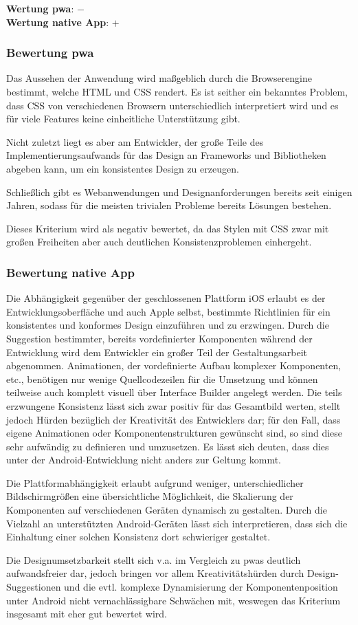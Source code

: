 \textbf{Wertung \ac{pwa}}: $-$\\
\textbf{Wertung native App}: $+$ \\

\subsubsection{Bewertung \ac{pwa}}
Das Aussehen der Anwendung wird maßgeblich durch die Browserengine bestimmt, welche HTML und CSS rendert. Es ist seither ein bekanntes Problem, dass CSS von verschiedenen Browsern unterschiedlich interpretiert wird und es für viele Features keine einheitliche Unterstützung gibt. \cite{MozillaHandlingCommonHTMLCSSProblems}

Nicht zuletzt liegt es aber am Entwickler, der große Teile des Implementierungsaufwands für das Design an Frameworks und Bibliotheken abgeben kann, um ein konsistentes Design zu erzeugen. 

Schließlich gibt es Webanwendungen und Designanforderungen bereits seit einigen Jahren, sodass für die meisten trivialen Probleme bereits Lösungen bestehen.

Dieses Kriterium wird als negativ bewertet, da das Stylen mit CSS zwar mit großen Freiheiten aber auch deutlichen Konsistenzproblemen einhergeht.

\subsubsection{Bewertung native App}
Die Abhängigkeit gegenüber der geschlossenen Plattform iOS erlaubt es der Entwicklungsoberfläche und auch Apple selbst, bestimmte Richtlinien für ein konsistentes und konformes Design einzuführen und zu erzwingen. Durch die Suggestion bestimmter, bereits vordefinierter Komponenten während der Entwicklung wird dem Entwickler ein großer Teil der Gestaltungsarbeit abgenommen. Animationen, der vordefinierte Aufbau komplexer Komponenten, etc., benötigen nur wenige Quellcodezeilen für die Umsetzung und können teilweise auch komplett visuell über Interface Builder angelegt werden. Die teils erzwungene Konsistenz lässt sich zwar positiv für das Gesamtbild werten, stellt jedoch Hürden bezüglich der Kreativität des Entwicklers dar; für den Fall, dass eigene Animationen oder Komponentenstrukturen gewünscht sind, so sind diese sehr aufwändig zu definieren und umzusetzen. Es lässt sich deuten, dass dies unter der Android-Entwicklung nicht anders zur Geltung kommt.

Die Plattformabhängigkeit erlaubt aufgrund weniger, unterschiedlicher Bildschirmgrößen eine übersichtliche Möglichkeit, die Skalierung der Komponenten auf verschiedenen Geräten dynamisch zu gestalten. Durch die Vielzahl an unterstützten Android-Geräten lässt sich interpretieren, dass sich die Einhaltung einer solchen Konsistenz dort schwieriger gestaltet.

Die Designumsetzbarkeit stellt sich v.a. im Vergleich zu \acp{pwa} deutlich aufwandsfreier dar, jedoch bringen vor allem Kreativitätshürden durch Design-Suggestionen und die evtl. komplexe Dynamisierung der Komponentenposition unter Android nicht vernachlässigbare Schwächen mit, weswegen das Kriterium insgesamt mit eher gut bewertet wird.
